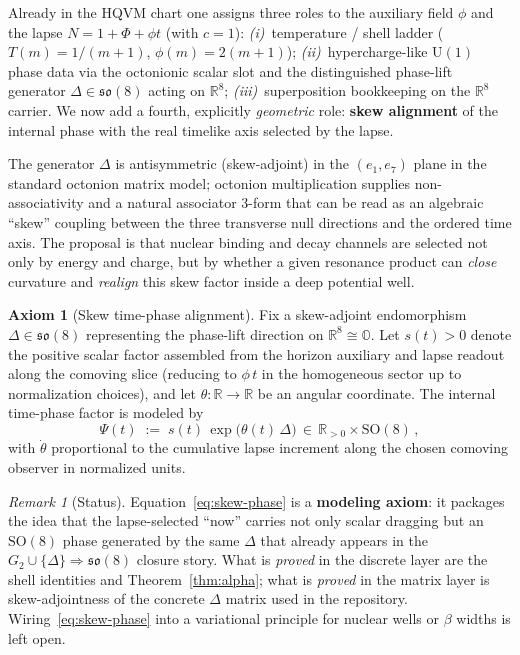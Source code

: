 \documentclass[11pt,a4paper]{article}
\theoremstyle{plain}
\theoremstyle{definition}
\theoremstyle{remark}
\newtheorem{remark}[theorem]{Remark}
\theoremstyle{plain}
\theoremstyle{definition}
\newtheorem{axiom}[theorem]{Axiom}
\begin{document}
Already in the HQVM chart one assigns three roles to the auxiliary field $\phi$ and the lapse $N=1+\Phi+\phi t$ (with $c=1$): \emph{(i)}~temperature / shell ladder ($T(m)=1/(m+1)$, $\phi(m)=2(m+1)$); \emph{(ii)}~hypercharge-like $\mathrm{U}(1)$ phase data via the octonionic scalar slot and the distinguished phase-lift generator $\Delta\in\mathfrak{so}(8)$ acting on $\mathbb{R}^8$; \emph{(iii)}~superposition bookkeeping on the $\mathbb{R}^8$ carrier.
We now add a fourth, explicitly \emph{geometric} role: \textbf{skew alignment} of the internal phase with the real timelike axis selected by the lapse.

The generator $\Delta$ is antisymmetric (skew-adjoint) in the $(e_1,e_7)$ plane in the standard octonion matrix model; octonion multiplication supplies non-associativity and a natural associator $3$-form that can be read as an algebraic ``skew'' coupling between the three transverse null directions and the ordered time axis.
The proposal is that nuclear binding and decay channels are selected not only by energy and charge, but by whether a given resonance product can \emph{close} curvature and \emph{realign} this skew factor inside a deep potential well.

\begin{axiom}[Skew time-phase alignment]\label{ax:skew}
Fix a skew-adjoint endomorphism $\Delta\in\mathfrak{so}(8)$ representing the phase-lift direction on $\mathbb{R}^8\cong\mathbb{O}$.
Let $s(t)>0$ denote the positive scalar factor assembled from the horizon auxiliary and lapse readout along the comoving slice (reducing to $\phi\,t$ in the homogeneous sector up to normalization choices), and let $\theta:\mathbb{R}\to\mathbb{R}$ be an angular coordinate.
The internal time-phase factor is modeled by
\begin{equation}\label{eq:skew-phase}
  \Psi(t) \;:=\; s(t)\,\exp\!\bigl(\theta(t)\,\Delta\bigr)\,\in\,\mathbb{R}_{>0}\times \mathrm{SO}(8)\,,
\end{equation}
with $\dot{\theta}$ proportional to the cumulative lapse increment along the chosen comoving observer in normalized units.
\end{axiom}

\begin{remark}[Status]
Equation~\eqref{eq:skew-phase} is a \textbf{modeling axiom}: it packages the idea that the lapse-selected ``now'' carries not only scalar dragging but an $\mathrm{SO}(8)$ phase generated by the same $\Delta$ that already appears in the $G_2\cup\{\Delta\}\Rightarrow\mathfrak{so}(8)$ closure story.
What is \emph{proved} in the discrete layer are the shell identities and Theorem~\ref{thm:alpha}; what is \emph{proved} in the matrix layer is skew-adjointness of the concrete $\Delta$ matrix used in the repository.
Wiring~\eqref{eq:skew-phase} into a variational principle for nuclear wells or $\beta$ widths is left open.
\end{remark}
\end{document}
